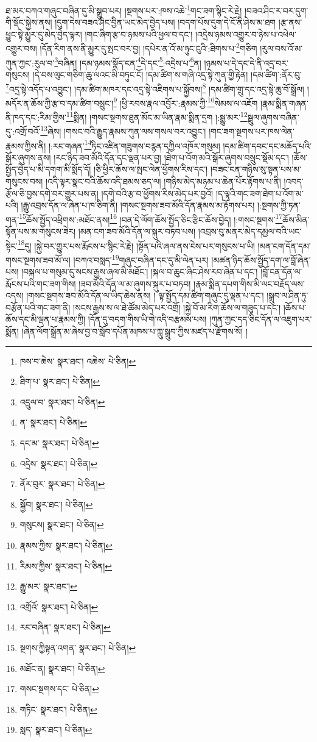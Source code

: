 ཐ་མར་བཀའ་གཞུང་བཞིན་དུ་མི་སྒྲུབ་པར། །སྔགས་པར་:ཁས་འཆེ་\footnote{ཁས་བ་ཆེས་  སྣར་ཐང་། འཆེས་  པེ་ཅིན། }གང་ཟག་སྙིང་རེ་རྗེ། །བཟའ་ཤིང་ར་བར་དུག་གི་སྡོང་སྐྱེས་ནས། །དུག་དེས་བཟའ་ཤིང་བྱིན་ཡང་མེད་བྱེད་པས། །བདག་པོས་དུག་དེ་ངོ་ནི་ཤེས་མ་ཐག །རྩ་ནས་ཕྱུང་སྟེ་མྱུར་དུ་མེད་བྱེད་ལྟར། །གང་ཞིག་རྩ་བ་ཉམས་པའི་ཕྱལ་བ་དང་། །འདྲེས་ཉམས་འགྱུར་བ་ཉེས་པ་འཕེལ་འགྱུར་བས། །དོན་རིག་ནས་ནི་མྱུར་དུ་སྤང་བར་བྱ། །དཔེར་ན་འོ་མ་ཉུང་ངུའི་:ཐིགས་པ་\footnote{ཐིག་པ་  སྣར་ཐང་།  པེ་ཅིན། }གཅིག །རུལ་བས་འོ་མ་ཀུན་ཀྱང་:རུལ་བ་\footnote{འདྲུལ་བ་  སྣར་ཐང་།  པེ་ཅིན། }བཞིན། །དམ་ཉམས་སྣོད་ངན་\footnote{ན་  སྣར་ཐང་།  པེ་ཅིན། }དེ་དང་\footnote{དང་མ་  སྣར་ཐང་།  པེ་ཅིན། }:འདྲེས་པ་\footnote{འདྲེས་  སྣར་ཐང་།  པེ་ཅིན། }ན། །ཉམས་པ་དེ་དང་དེ་ནི་འདྲ་བར་གསུངས། །དེ་བས་ལུང་གཅིག་ཆུ་ལའང་མི་བཏུང་ངོ། །དམ་ཚིག་ས་གཞི་འདྲ་སྟེ་ཀུན་གྱི་རྟེན། །དམ་ཚིག་:ནོར་བུ་\footnote{ནོར་བུར་  སྣར་ཐང་།  པེ་ཅིན། }འདྲ་སྟེ་འདོད་པ་འབྱུང་། །དམ་ཚིག་མཁར་དང་འདྲ་སྟེ་འཇིགས་པ་སྐྱོབས།\footnote{སྐྱོབ།  སྣར་ཐང་།  པེ་ཅིན། } །དམ་ཚིག་གྲུ་དང་འདྲ་སྟེ་ཆུ་བོ་སྒྲོལ། །མདོར་ན་ཆོས་ཀྱི་རྩ་བ་དམ་ཚིག་བསྲུང་།\footnote{གསུངས།  སྣར་ཐང་།  པེ་ཅིན། } །ཕྱི་རབས་རྣལ་འབྱོར་:རྣམས་ཀྱི་\footnote{རྣམས་ཀྱིས་  སྣར་ཐང་།  པེ་ཅིན། }སེམས་ལ་འཇོག །རྣམ་སྨིན་གཞན་ནི་ཁད་དང་:རིམ་གྱིས་\footnote{རིམས་ཀྱིས་  སྣར་ཐང་།  པེ་ཅིན། }སྨིན། །གསང་སྔགས་ཐུན་མོང་མ་ཡིན་རྣམ་སྨིན་དྲག །:སྒྱུ་མར་\footnote{རྒྱུ་མར་  སྣར་ཐང་། }སྦྲུལ་ཞུགས་བཞིན་དུ་:འགྲོ་བའོ་\footnote{འགྲོའོ་  སྣར་ཐང་།  པེ་ཅིན། }ཞེས། །གསང་བའི་རྒྱུད་རྣམས་ཀུན་ལས་གསལ་བར་འབྱུང་། །གང་ཟག་སྔགས་པར་ཁས་ལེན་རྣམས་ཀྱིས་ནི། །:རང་གཞན་\footnote{རང་བཞིན་  སྣར་ཐང་།  པེ་ཅིན། }ཏིང་འཛིན་གཟུགས་བརྙན་དཀྱིལ་འཁོར་གསུམ། །དམ་ཚིག་དབང་དང་མཆོད་པའི་སྒོར་ཞུགས་ནས། །རང་ཉིད་ཟབ་མོའི་དོན་དང་ལྡན་པར་བྱ། །ཐེག་པ་འོག་མའི་སྒོར་ཞུགས་བསྲུང་སྡོམ་དང་། །ཆོས་སྤྱོད་བྱེད་པ་མི་དགག་མི་སྨོད་དོ། །ཅི་ཕྱིར་ཆོས་ལ་སྤང་ལེན་ཕྱོགས་རིས་དང་། །བཟང་ངན་གཉིས་སུ་སྟན་པས་མ་གསུངས་བས། །འདི་ལྟར་སྣང་བའི་ཆོས་འདི་ཐམས་ཅད་ལ། །གཉིས་མེད་མཉམ་པ་ཆེན་པོར་རྟོགས་པ་ནི། །འབད་རྩོལ་ཅི་བྱས་དགེ་བར་གྱུར་པས་ན། །དགེ་བའི་རྩ་བ་ཕྱོགས་རིས་མེད་པར་བྱའོ། །ད་ལྟའི་གང་ཟག་ཐེག་པ་འོག་མ་པའི། །རྒྱུ་འབྲས་དོན་ལ་ཞེན་པ་ཁ་ཅིག་ནི། །གསང་སྔགས་ཟབ་མོའི་དོན་རྣམས་མ་རྟོགས་པར། །:སྔགས་ཀྱི་ཏན་གན་\footnote{སྔགས་ཀྱིསྟན་འགན་  སྣར་ཐང་།  པེ་ཅིན། }ཆོས་སྤྱོད་འཕྲིགས་:མཐོང་ནས།\footnote{མཐོང་ན།  སྣར་ཐང་།  པེ་ཅིན། } །བན་དེ་ལོག་ཆོས་སྤྱོད་ཅིང་རྩིང་ཆོས་བྱེད། །:གསང་སྔགས་\footnote{གསང་སྔགས་དང་  པེ་ཅིན། }ཆོས་མིན་སྟོན་པས་མ་གསུངས་ཟེར། །མན་ངག་ཟབ་མོའི་དོན་ལ་སྐུར་བཏབ་པས། །འབྲས་བུ་མནར་མེད་དམྱལ་བའི་ཡང་སྟེང་\footnote{གཏིང་  སྣར་ཐང་།  པེ་ཅིན། }དུ། །སྐྱེ་བར་གྱུར་པས་རྨོངས་པ་སྙིང་རེ་རྗེ། །སྟོན་པའི་ཞལ་ནས་ངེས་པར་གསུངས་པ་ཡི། །མན་ངག་དོན་དམ་གསང་སྔགས་ཟབ་མོ་ལ། །བཀའ་བསླད་\footnote{སླད་  སྣར་ཐང་།  པེ་ཅིན། }གཞུང་བཞིན་དང་དུ་མི་ལེན་པར། །མཚན་ཉིད་ཆོས་སྤྱོད་དག་ལ་བློ་ཞེན་པས། །བསྐལ་པ་གསུམ་དུ་སངས་རྒྱས་ཞལ་མི་མཐོང་། །སྐལ་བ་ཆུང་ཞིང་ཤེས་རབ་ཞེན་པ་དང་། །བློ་ངན་དོན་ལ་རྨོངས་པའི་གང་ཟག་གིས། །ཟབ་མོའི་དོན་ལ་མ་ཞུགས་སྐུར་པ་བཏབ། །རྣམ་སྨིན་དཔག་གིས་མི་ལང་བརྗོད་ལས་འདས། །གསང་སྔགས་ཟབ་མོའི་དོན་ལ་ཡིད་ཆེས་ནས། །
ལྟ་སྤྱོད་དམ་ཚིག་གཞུང་དུ་ལྡན་པ་དང་། །སྒྲུབ་ལ་ཤིན་ཏུ་བརྩོན་པའི་གང་ཟག་ནི། །སངས་རྒྱས་ས་ལ་ཐེ་ཚོམ་མེད་པར་འགྲོ། །སྐྱེ་བོ་མ་རིག་ཆོས་ལ་གཟུད་པ་དང་། །ཆོས་པ་ཆོས་དང་མི་ལྡན་པ་རྣམས་ཀྱི། །དོན་དུ་བདག་གིས་ཡི་གེ་འདི་བརྩམས་པས། །ཀུན་ཀྱང་དད་ཅིང་དོན་ལ་འཇུག་པར་སྨོན། །ཞེན་ལོག་སྒྲོན་མ་ཞེས་བྱ་བ་སློབ་དཔོན་མཁས་པ་ཀླུ་སྒྲུབ་ཀྱིས་མཛད་པ་རྫོགས་སོ། ། 